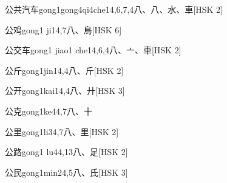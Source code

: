 \begin{EntryWithPhonetic}{公共汽车}{gong1gong4qi4che1}{4,6,7,4}{⼋、⼋、⽔、⾞}[HSK 2]
\end{EntryWithPhonetic}

\begin{EntryWithPhonetic}{公鸡}{gong1 ji1}{4,7}{⼋、⿃}[HSK 6]
\end{EntryWithPhonetic}

\begin{EntryWithPhonetic}{公交车}{gong1 jiao1 che1}{4,6,4}{⼋、⼇、⾞}[HSK 2]
\end{EntryWithPhonetic}

\begin{EntryWithPhonetic}{公斤}{gong1jin1}{4,4}{⼋、⽄}[HSK 2]
\end{EntryWithPhonetic}

\begin{EntryWithPhonetic}{公开}{gong1kai1}{4,4}{⼋、⼶}[HSK 3]
\end{EntryWithPhonetic}

\begin{EntryWithPhonetic}{公克}{gong1ke4}{4,7}{⼋、⼗}
\end{EntryWithPhonetic}

\begin{EntryWithPhonetic}{公里}{gong1li3}{4,7}{⼋、⾥}[HSK 2]
\end{EntryWithPhonetic}

\begin{EntryWithPhonetic}{公路}{gong1 lu4}{4,13}{⼋、⾜}[HSK 2]
\end{EntryWithPhonetic}

\begin{EntryWithPhonetic}{公民}{gong1min2}{4,5}{⼋、⽒}[HSK 3]
\end{EntryWithPhonetic}

